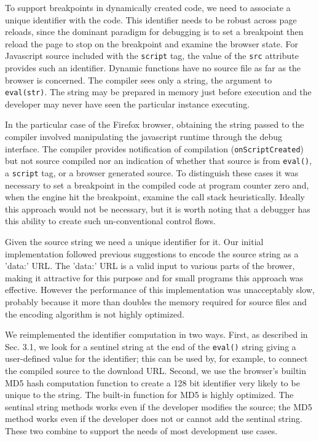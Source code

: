 \documentclass{www2010-accepted}
\begin{document}
To support breakpoints in dynamically created code, we need to
associate a unique identifier with the code. This identifier needs to
be robust across page reloads, since the dominant paradigm for
debugging is to set a breakpoint then reload the page to stop on the
breakpoint and examine the browser state.  For Javascript source
included with the \texttt{script} tag, the value of the \texttt{src}
attribute provides such an identifier.  Dynamic functions have no
source file as far as the browser is concerned. The compiler sees only
a string, the argument to \texttt{eval(str)}.  The string may be
prepared in memory just before execution and the developer may never
have seen the particular instance executing.

In the particular case of the Firefox browser, obtaining the string
passed to the compiler involved manipulating the javascript runtime
through the debug interface. The compiler provides notification of
compilation (\texttt{onScriptCreated}) but not source compiled nor an
indication of whether that source is from \texttt{eval()}, a
\texttt{script} tag, or a browser generated source.  To distinguish
these cases it was necessary to set a breakpoint in the compiled code
at program counter zero and, when the engine hit the breakpoint,
examine the call stack heuristically. Ideally this approach would not
be necessary, but it is worth noting that a debugger has this ability
to create such un-conventional control flows.

Given the source string we need a unique identifier for it.  Our
initial implementation followed previous suggestions to encode the
source string as a 'data:' URL\cite{Bugzilla307984}. The 'data:' URL is a valid
input to various parts of the brower, making it attractive for this
purpose and for small programs this approach was effective. However
the performance of this implementation was unacceptably slow, probably
because it more than doubles the memory required for source files and
the encoding algorithm is not highly optimized.

We reimplemented the identifier computation in two ways.  First, as 
described in Sec. 3.1, we
look for a sentinel string at the end of the \texttt{eval()} string
giving a user-defined value for the identifier; this can be used by,
for example, to connect the compiled source to the download
URL.  Second, we use the browser's builtin MD5 hash computation
function to create a 128 bit identifier very likely to be unique to
the string.  The built-in function for MD5 is highly optimized. 
The sentinal string methods works even if the developer modifies the 
source; the MD5 method works even if the developer does not or cannot 
add the sentinal string. These two combine to support the needs of most 
development use cases.
\end{document}
